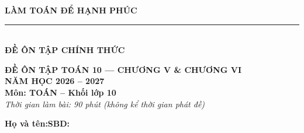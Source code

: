 \documentclass[12pt,a4paper]{article}
\begin{document}
\noindent
\begin{minipage}[c]{0.38\textwidth}
    \centering
    \textbf{LÀM TOÁN ĐỂ HẠNH PHÚC}\\[-2pt]
    \rule{3.2cm}{0.6pt}\\[2pt]
    \textbf{ĐỀ ÔN TẬP CHÍNH THỨC}
\end{minipage}\hfill
\begin{minipage}[c]{0.52\textwidth}
    \centering
    \textbf{ĐỀ ÔN TẬP TOÁN 10 — CHƯƠNG V \& CHƯƠNG VI}\\[1pt]
    \textbf{NĂM HỌC 2026 -- 2027}\\[1pt]
    \textbf{Môn: TOÁN -- Khối lớp 10}\\
    \textit{\small Thời gian làm bài: 90 phút (không kể thời gian phát đề)}
\end{minipage}

\vspace{0.05cm}
\noindent
\begin{minipage}[b]{0.78\textwidth}
    \textbf{Họ và tên:}\dotfill\textbf{SBD:}\makebox[3.5cm]{\dotfill}
\end{minipage}\hfill
\begin{minipage}[b]{0.20\textwidth}
    \hfill
    \setlength{\fboxrule}{0.8pt}%
\end{minipage}
\vspace{0.05cm}
\end{document}
